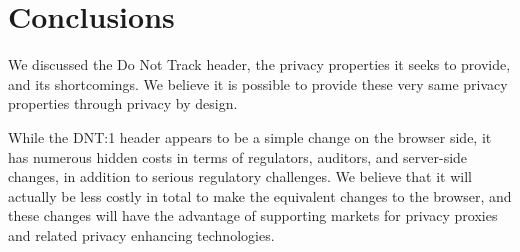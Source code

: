 \documentclass[letterpaper,11pt]{llncs}
\begin{document}
\section{Conclusions}

We discussed the Do Not Track header, the privacy properties it seeks to
provide, and its shortcomings. We believe it is possible to provide these very
same privacy properties through privacy by design.

While the DNT:1 header appears to be a simple change on the browser side, it
has numerous hidden costs in terms of regulators, auditors, and server-side
changes, in addition to serious regulatory challenges. We believe that it will
actually be less costly in total to make the equivalent changes to the
browser, and these changes will have the advantage of supporting markets for
privacy proxies and related privacy enhancing technologies.

 

\clearpage
\appendix
\end{document}
